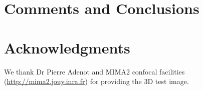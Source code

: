 \documentclass{InsightArticle}
\begin{document}
\section{Comments and Conclusions}

\section{Acknowledgments}
We thank Dr Pierre Adenot and MIMA2 confocal facilities
(\url{http://mima2.jouy.inra.fr}) for providing the 3D test image.



\appendix





\nocite{ITKSoftwareGuide}
\end{document}
